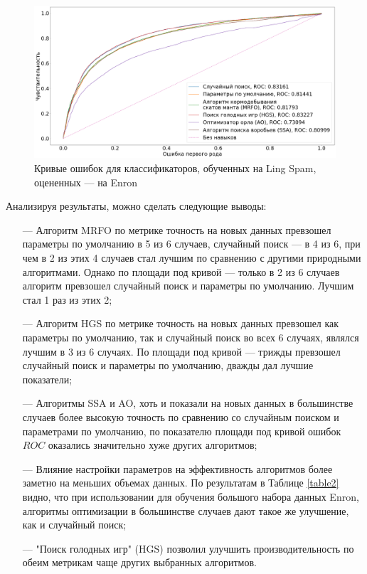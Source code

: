 \begin{figure}[H]
    \centering
    \includegraphics[width=165mm]{static/LS-EN.png}
    \caption{Кривые ошибок для классификаторов, обученных на Ling Spam, оцененных — на Enron}
    \label{LS-EN}
\end{figure}

Анализируя результаты, можно сделать следующие выводы:

\begin{itemize}
    \item[—] Алгоритм MRFO по метрике точность на новых данных превзошел параметры по умолчанию в 5 из 6 случаев,
    случайный поиск — в 4 из 6, при чем в 2 из этих 4 случаев стал лучшим по сравнению с другими природными алгоритмами.
    Однако по площади под кривой — только в 2 из 6 случаев алгоритм превзошел случайный поиск и параметры по умолчанию.  
    Лучшим стал 1 раз из этих 2;
    
    \item[—] Алгоритм HGS по метрике точность на новых данных превзошел как параметры по умолчанию, так и 
    случайный поиск во всех 6 случаях, являлся лучшим в 3 из 6 случаях.
    По площади под кривой — трижды превзошел случайный поиск и параметры по умолчанию, дважды дал лучшие показатели;

    \item[—] Алгоритмы SSA и AO, хоть и показали на новых данных в большинстве случаев 
    более высокую точность по сравнению со случайным поиском и параметрами по умолчанию, по показателю площади 
    под кривой ошибок $ROC$ оказались значительно хуже других алгоритмов;

    \item[—] Влияние настройки параметров на эффективность алгоритмов более заметно на меньших объемах данных. 
    По результатам в Таблице \ref{table2} видно, что при использовании для обучения большого набора данных Enron, 
    алгоритмы оптимизации в большинстве случаев дают такое же улучшение, как и случайный поиск;
    
    \item[—] "Поиск голодных игр" (HGS) позволил улучшить производительность по обеим метрикам чаще других выбранных  
    алгоритмов.
\end{itemize}
